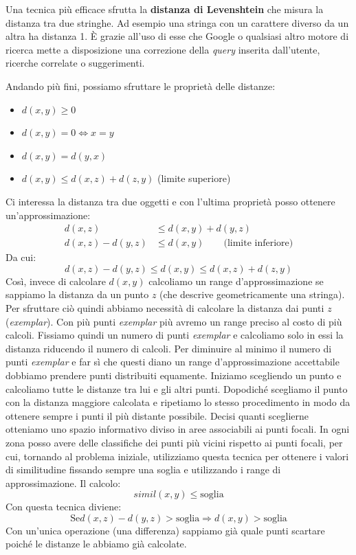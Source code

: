 			Una tecnica più efficace sfrutta la \textbf{distanza di Levenshtein} che misura la distanza tra due stringhe. Ad esempio una stringa con un carattere diverso da un altra ha distanza 1. È grazie all'uso di esse che Google o qualsiasi altro motore di ricerca mette a disposizione una correzione della \emph{query} inserita dall'utente, ricerche correlate o suggerimenti.
			
			Andando più fini, possiamo sfruttare le proprietà delle distanze:
			\begin{itemize}
				\item $d(x,y)\ge 0$
				\item $d(x,y)=0 \Leftrightarrow x=y$
				\item $d(x,y)=d(y,x)$
				\item $d(x,y) \le d(x,z)+d(z,y)$ (limite superiore)
			\end{itemize}
			Ci interessa la distanza tra due oggetti e con l'ultima proprietà posso ottenere un'approssimazione:
			\begin{align}
				d(x,z) &\le d(x,y)+d(y,z) \\
				d(x,z)-d(y,z) &\le d(x,y) \quad \quad \text{(limite inferiore)}
			\end{align}
			Da cui:
			\[
				d(x,z)-d(y,z) \le d(x,y) \le d(x,z) + d(z,y)
			\]
			Così, invece di calcolare $d(x,y)$ calcoliamo un range d'approssimazione se sappiamo la distanza da un punto $z$ (che descrive geometricamente una stringa). Per sfruttare ciò quindi abbiamo necessità di calcolare la distanza dai punti $z$ (\emph{exemplar}). Con più punti \emph{exemplar} più avremo un range preciso al costo di più calcoli. Fissiamo quindi un numero di punti \emph{exemplar} e calcoliamo solo in essi la distanza riducendo il numero di calcoli.
			Per diminuire al minimo il numero di punti \emph{exemplar} e far sì che questi diano un range d'approssimazione accettabile dobbiamo prendere punti distribuiti equamente. 
			Iniziamo scegliendo un punto e calcoliamo tutte le distanze tra lui e gli altri punti. Dopodiché scegliamo il punto con la distanza maggiore calcolata e ripetiamo lo stesso procedimento in modo da ottenere sempre i punti il più distante possibile.
			Decisi quanti sceglierne otteniamo uno spazio informativo diviso in aree associabili ai punti focali. In ogni zona posso avere delle classifiche dei punti più vicini rispetto ai punti focali, per cui, tornando al problema iniziale, utilizziamo questa tecnica per ottenere i valori di similitudine fissando sempre una soglia e utilizzando i range di approssimazione. Il calcolo:
			\[
				simil(x,y) \le \text{soglia}
			\]
			Con questa tecnica diviene:
			\[
				\text{Se} d(x,z) - d(y,z) > \text{soglia} \Rightarrow d(x,y)>\text{soglia}
			\]
			Con un'unica operazione (una differenza) sappiamo già quale punti scartare poiché le distanze le abbiamo già calcolate.
			
